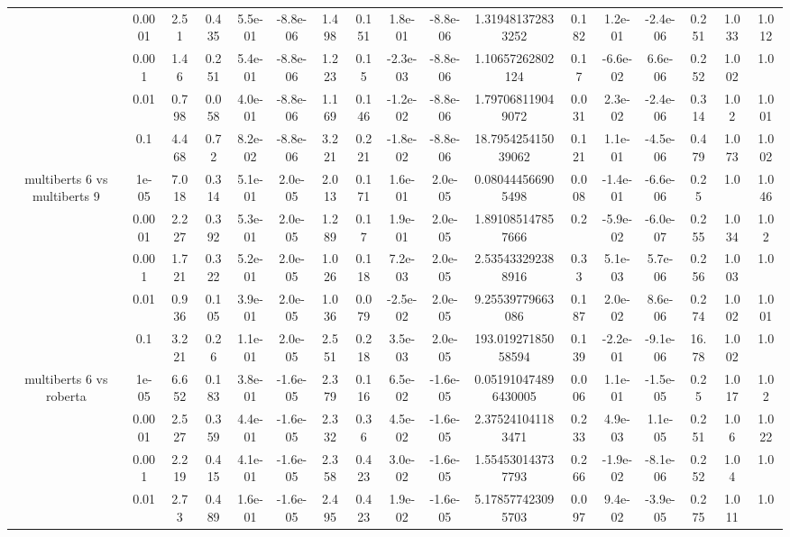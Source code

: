 \begin{tabular}{|c|c|c|c|c|c|c|c|c|c|c|c|c|c|c|c|c|}
 & 0.0001 & 2.51 & 0.435 & 5.5e-01 & -8.8e-06 & 1.498 & 0.151 & 1.8e-01 & -8.8e-06 & 1.319481372833252 & 0.182 & 1.2e-01 & -2.4e-06 & 0.251 & 1.033 & 1.012 \\
 & 0.001 & 1.46 & 0.251 & 5.4e-01 & -8.8e-06 & 1.223 & 0.15 & -2.3e-03 & -8.8e-06 & 1.10657262802124 & 0.17 & -6.6e-02 & 6.6e-06 & 0.252 & 1.002 & 1.0 \\
 & 0.01 & 0.798 & 0.058 & 4.0e-01 & -8.8e-06 & 1.169 & 0.146 & -1.2e-02 & -8.8e-06 & 1.797068119049072 & 0.031 & 2.3e-02 & -2.4e-06 & 0.314 & 1.02 & 1.001 \\
 & 0.1 & 4.468 & 0.72 & 8.2e-02 & -8.8e-06 & 3.221 & 0.221 & -1.8e-02 & -8.8e-06 & 18.795425415039062 & 0.121 & 1.1e-01 & -4.5e-06 & 0.479 & 1.073 & 1.002 \\
\hline
\multirow{5}{*}{multiberts 6 vs multiberts 9} & 1e-05 & 7.018 & 0.314 & 5.1e-01 & 2.0e-05 & 2.013 & 0.171 & 1.6e-01 & 2.0e-05 & 0.080444566905498 & 0.008 & -1.4e-01 & -6.6e-06 & 0.25 & 1.0 & 1.046 \\
 & 0.0001 & 2.227 & 0.392 & 5.3e-01 & 2.0e-05 & 1.289 & 0.17 & 1.9e-01 & 2.0e-05 & 1.891085147857666 & 0.2 & -5.9e-02 & -6.0e-07 & 0.255 & 1.034 & 1.02 \\
 & 0.001 & 1.721 & 0.322 & 5.2e-01 & 2.0e-05 & 1.026 & 0.118 & 7.2e-03 & 2.0e-05 & 2.535433292388916 & 0.33 & 5.1e-03 & 5.7e-06 & 0.256 & 1.003 & 1.0 \\
 & 0.01 & 0.936 & 0.105 & 3.9e-01 & 2.0e-05 & 1.036 & 0.079 & -2.5e-02 & 2.0e-05 & 9.25539779663086 & 0.187 & 2.0e-02 & 8.6e-06 & 0.274 & 1.002 & 1.001 \\
 & 0.1 & 3.221 & 0.26 & 1.1e-01 & 2.0e-05 & 2.551 & 0.218 & 3.5e-03 & 2.0e-05 & 193.01927185058594 & 0.139 & -2.2e-01 & -9.1e-06 & 16.78 & 1.002 & 1.0 \\
\hline
\multirow{5}{*}{multiberts 6 vs roberta } & 1e-05 & 6.652 & 0.183 & 3.8e-01 & -1.6e-05 & 2.379 & 0.116 & 6.5e-02 & -1.6e-05 & 0.051910474896430005 & 0.006 & 1.1e-01 & -1.5e-05 & 0.25 & 1.017 & 1.02 \\
 & 0.0001 & 2.527 & 0.359 & 4.4e-01 & -1.6e-05 & 2.332 & 0.36 & 4.5e-02 & -1.6e-05 & 2.375241041183471 & 0.233 & 4.9e-03 & 1.1e-05 & 0.251 & 1.06 & 1.022 \\
 & 0.001 & 2.219 & 0.415 & 4.1e-01 & -1.6e-05 & 2.358 & 0.423 & 3.0e-02 & -1.6e-05 & 1.554530143737793 & 0.266 & -1.9e-02 & -8.1e-06 & 0.252 & 1.04 & 1.0 \\
 & 0.01 & 2.73 & 0.489 & 1.6e-01 & -1.6e-05 & 2.495 & 0.423 & 1.9e-02 & -1.6e-05 & 5.178577423095703 & 0.097 & 9.4e-02 & -3.9e-05 & 0.275 & 1.011 & 1.0 \\

\end{tabular}
